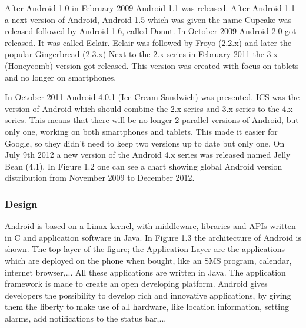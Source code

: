 \documentclass[a4paper,12pt]{report}
\begin{document}
After Android 1.0 in February 2009 Android 1.1 was released. After Android 1.1 a next version of Android, Android 1.5 which was given the name Cupcake was released followed by 
Android 1.6, called Donut. In October 2009 Android 2.0 got released. It was called Eclair. Eclair was followed by Froyo (2.2.x) and later the popular Gingerbread (2.3.x)
Next to the 2.x series in February 2011 the 3.x (Honeycomb) version got released. This version was created with focus on tablets and no longer on smartphones.

In October 2011 Android 4.0.1 (Ice Cream Sandwich) was presented. ICS was the version of Android which should combine the 2.x series and 3.x series to the 4.x series.
This means that there will be no longer 2 parallel versions of Android, but only one, working on both smartphones and tablets. This made it easier for Google, so they 
didn't need to keep two versions up to date but only one. On July 9th 2012 a new version of the Android 4.x series was released named Jelly Bean (4.1).
In Figure 1.2 one can see a chart showing global Android version distribution from November 2009 to December 2012.

\subsubsection{Design}

Android is based on a Linux kernel, with middleware, libraries and APIs written in C and application software in Java. In Figure 1.3 the architecture of Android is shown.
The top layer of the figure; the Application Layer are the applications which are deployed on the phone when bought, like an SMS program, calendar, internet browser,...
All these applications are written in Java. The application framework is made to create an open developing platform. Android gives developers the possibility to develop
rich and innovative applications, by giving them the liberty to make use of all hardware, like location information, setting alarms, add notifications to the status bar,...
\end{document}

